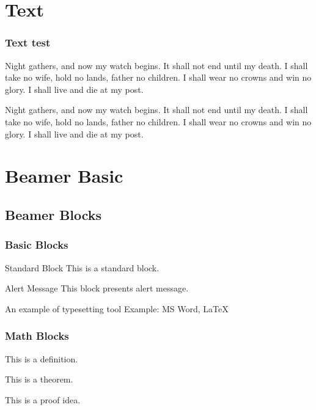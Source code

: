 \frame[plain]{\titlepage}

\section{Text}

\begin{frame}
    \frametitle{Text test}
    
    Night gathers, and now my watch begins.
    It shall not end until my death.
    I shall take no wife, hold no lands, father no children.
    I shall wear no crowns and win no glory.
    I shall live and die at my post.

    \vspace{0.4cm}

    \pause

    Night gathers, and now my watch begins.
    It shall not end until my death.
    I shall take no wife, hold no lands, father no children.
    I shall wear no crowns and win no glory.
    I shall live and die at my post.
    
\end{frame}

\section{Beamer Basic}
\subsection{Beamer Blocks}

\begin{frame}
    \frametitle{Basic Blocks}

    \begin{block}{Standard Block}
        This is a standard block.
    \end{block}
    \begin{alertblock}{Alert Message}
        This block presents alert message.
    \end{alertblock}
    \begin{exampleblock}{An example of typesetting tool}
        Example: MS Word, \LaTeX{}
    \end{exampleblock}

\end{frame}

\begin{frame}
    \frametitle{Math Blocks}

    \begin{definition} 
        This is a definition.
    \end{definition}
    
    \begin{theorem} 
        This is a theorem. 
    \end{theorem}
    
    \begin{lemma} 
        This is a proof idea.
    \end{lemma}

\end{frame}

